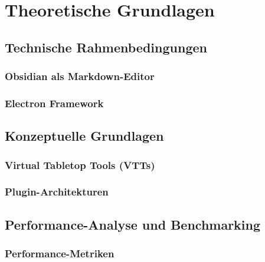 \chapter{Theoretische Grundlagen}
\label{sec:GrundlagenKapitel}

\section{Technische Rahmenbedingungen}

\subsection{Obsidian als Markdown-Editor}

\subsection{Electron Framework}

\section{Konzeptuelle Grundlagen}

\subsection{Virtual Tabletop Tools (VTTs)}

\subsection{Plugin-Architekturen}

\section{Performance-Analyse und Benchmarking}

\subsection{Performance-Metriken}

